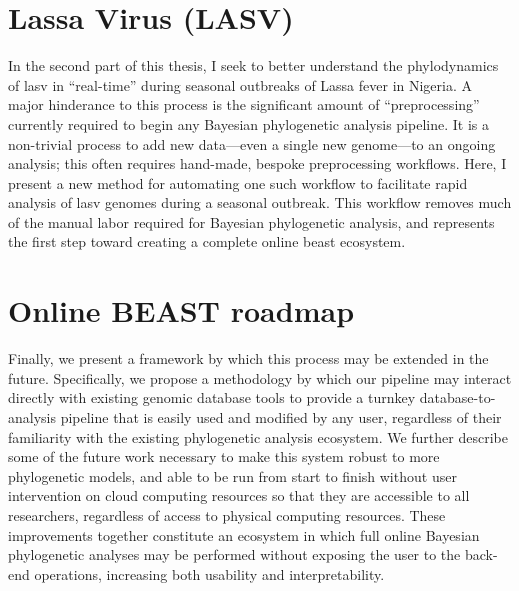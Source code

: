 \section{Lassa Virus (LASV)}
In the second part of this thesis, I seek to better understand the phylodynamics of \gls{lasv} in ``real-time'' during seasonal outbreaks of Lassa fever in Nigeria.
A major hinderance to this process is the significant amount of ``preprocessing'' currently required to begin any Bayesian phylogenetic analysis pipeline.
It is a non-trivial process to add new data---even a single new genome---to an ongoing analysis; this often requires hand-made, bespoke preprocessing workflows.
Here, I present a new method for automating one such workflow to facilitate rapid analysis of \gls{lasv} genomes during a seasonal outbreak.
This workflow removes much of the manual labor required for Bayesian phylogenetic analysis, and represents the first step toward creating a complete online \gls{beast} ecosystem. 

\section{Online BEAST roadmap}

Finally, we present a framework by which this process may be extended in the future.
Specifically, we propose a methodology by which our pipeline may interact directly with existing genomic database tools to provide a turnkey database-to-analysis pipeline that is easily used and modified by any user, regardless of their familiarity with the existing phylogenetic analysis ecosystem.
We further describe some of the future work necessary to make this system robust to more phylogenetic models, and able to be run from start to finish without user intervention on cloud computing resources so that they are accessible to all researchers, regardless of access to physical computing resources.
These improvements together constitute an ecosystem in which full online Bayesian phylogenetic analyses may be performed without exposing the user to the back-end operations, increasing both usability and interpretability.


\cleardoublepage

